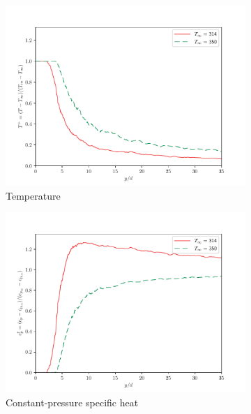 \begin{figure}[H]
\begin{center}
\begin{subfigure}{0.45\textwidth}
\centering
	\includegraphics[scale=.35]{figures/Plots/centerline/temp_centerline_scaled.pdf}
	\caption{Temperature} \label{noniso_temp_centerline_1}
\end{subfigure}
\begin{subfigure}{0.45\textwidth}
\centering
	\includegraphics[scale=.35]{figures/Plots/centerline/cp_centerline_scaled.pdf}
	\caption{Constant-pressure specific heat} \label{noniso_cp_centerline_1}
\end{subfigure}
\vfill
\begin{subfigure}{0.45\textwidth}

\end{subfigure}
\end{center}
\end{figure}

